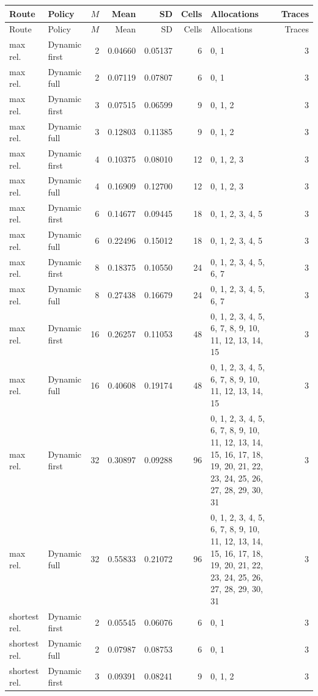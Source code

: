 \documentclass[10pt,a4paper]{article}
\begin{document}
\tiny\setlength{\tabcolsep}{2pt}\begin{longtable}{@{}p{23mm}p{29mm}rrrrp{36mm}r@{}}
\toprule Route & Policy & $M$ & Mean & SD & Cells & Allocations & Traces \\ \midrule\endfirsthead
\toprule Route & Policy & $M$ & Mean & SD & Cells & Allocations & Traces \\ \midrule\endhead
\bottomrule\endfoot
max rel. & Dynamic first & 2 & 0.04660 & 0.05137 & 6 & 0, 1 & 3 \\
max rel. & Dynamic full & 2 & 0.07119 & 0.07807 & 6 & 0, 1 & 3 \\
max rel. & Dynamic first & 3 & 0.07515 & 0.06599 & 9 & 0, 1, 2 & 3 \\
max rel. & Dynamic full & 3 & 0.12803 & 0.11385 & 9 & 0, 1, 2 & 3 \\
max rel. & Dynamic first & 4 & 0.10375 & 0.08010 & 12 & 0, 1, 2, 3 & 3 \\
max rel. & Dynamic full & 4 & 0.16909 & 0.12700 & 12 & 0, 1, 2, 3 & 3 \\
max rel. & Dynamic first & 6 & 0.14677 & 0.09445 & 18 & 0, 1, 2, 3, 4, 5 & 3 \\
max rel. & Dynamic full & 6 & 0.22496 & 0.15012 & 18 & 0, 1, 2, 3, 4, 5 & 3 \\
max rel. & Dynamic first & 8 & 0.18375 & 0.10550 & 24 & 0, 1, 2, 3, 4, 5, 6, 7 & 3 \\
max rel. & Dynamic full & 8 & 0.27438 & 0.16679 & 24 & 0, 1, 2, 3, 4, 5, 6, 7 & 3 \\
max rel. & Dynamic first & 16 & 0.26257 & 0.11053 & 48 & 0, 1, 2, 3, 4, 5, 6, 7, 8, 9, 10, 11, 12, 13, 14, 15 & 3 \\
max rel. & Dynamic full & 16 & 0.40608 & 0.19174 & 48 & 0, 1, 2, 3, 4, 5, 6, 7, 8, 9, 10, 11, 12, 13, 14, 15 & 3 \\
max rel. & Dynamic first & 32 & 0.30897 & 0.09288 & 96 & 0, 1, 2, 3, 4, 5, 6, 7, 8, 9, 10, 11, 12, 13, 14, 15, 16, 17, 18, 19, 20, 21, 22, 23, 24, 25, 26, 27, 28, 29, 30, 31 & 3 \\
max rel. & Dynamic full & 32 & 0.55833 & 0.21072 & 96 & 0, 1, 2, 3, 4, 5, 6, 7, 8, 9, 10, 11, 12, 13, 14, 15, 16, 17, 18, 19, 20, 21, 22, 23, 24, 25, 26, 27, 28, 29, 30, 31 & 3 \\
shortest rel. & Dynamic first & 2 & 0.05545 & 0.06076 & 6 & 0, 1 & 3 \\
shortest rel. & Dynamic full & 2 & 0.07987 & 0.08753 & 6 & 0, 1 & 3 \\
shortest rel. & Dynamic first & 3 & 0.09391 & 0.08241 & 9 & 0, 1, 2 & 3 \\

\end{longtable}
\end{document}
